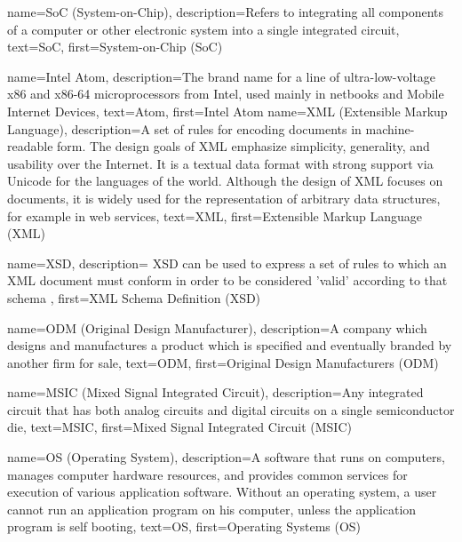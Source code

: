 {
  name=SoC (System-on-Chip),
  description={Refers to integrating all components of a computer or
    other electronic system into a single integrated circuit},
  text=SoC,
  first=System-on-Chip (SoC)
}


{
  name=Intel Atom\textsuperscript{\texttrademark},
  description={The brand name for a line of ultra-low-voltage x86 and
    x86-64 microprocessors from Intel, used mainly in netbooks and
    Mobile Internet Devices},
  text=Atom,
  first=Intel Atom\textsuperscript{\texttrademark}
}
{
  name=XML (Extensible Markup Language),
  description={A set of rules for encoding documents in
    machine-readable form. The design goals of XML emphasize
    simplicity, generality, and usability over the Internet. It is a
    textual data format with strong support via Unicode for the
    languages of the world. Although the design of XML focuses on
    documents, it is widely used for the representation of arbitrary
    data structures, for example in web services},
  text=XML,
  first=Extensible Markup Language (XML)
}

{
  name=XSD,
  description={
    XSD can be used to express a set of rules to which an XML document must
    conform in order to be considered 'valid' according to that schema
  },
  first=XML Schema Definition (XSD)
}

{
  name=ODM (Original Design Manufacturer),
  description={A company which designs and manufactures a product
    which is specified and eventually branded by another firm for
    sale},
  text=ODM,
  first=Original Design Manufacturers (ODM)
}

{
  name=MSIC (Mixed Signal Integrated Circuit),
  description={Any integrated circuit that has both analog circuits
    and digital circuits on a single semiconductor die},
  text=MSIC,
  first=Mixed Signal Integrated Circuit (MSIC)
}

{
  name=OS (Operating System),
  description={A software that runs on computers, manages computer
    hardware resources, and provides common services for execution of
    various application software. Without an operating system, a user
    cannot run an application program on his computer, unless the
    application program is self booting},
  text=OS,
  first=Operating Systems (OS)
}

